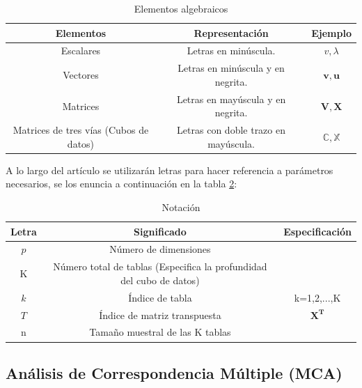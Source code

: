 \documentclass[water,article,submit,moreauthors,pdftex]{mdpi}
\begin{document}
\begin{table}[!ht]
\begin{center}
 \begin{tabular}{||c ||c |c ||} 
 \hline
 Elementos & Representación & Ejemplo \\
 \hline\hline
 Escalares & Letras en minúscula. & $v,\lambda$\\
\hline
Vectores & Letras en minúscula y en negrita. & $\mathbf{v},\mathbf{u}$\\
\hline
Matrices & Letras en mayúscula y en negrita. & $\mathbf{V},\mathbf{X}$\\
\hline
Matrices de tres vías (Cubos de datos) & Letras con doble trazo en mayúscula. & $\mathbb{C},\mathbb{X}$\\
\hline
\end{tabular}\caption{Elementos algebraicos}
\label{tab:notacion}
\end{center}
\end{table}

A lo largo del artículo se utilizarán letras para hacer referencia a
parámetros necesarios, se los enuncia a continuación en la tabla
\ref{tab:notacion2}:

\begin{table}[!ht]
\begin{center}
 \begin{tabular}{||c ||c | c ||} 
 \hline
 Letra &  Significado & Especificación\\
 \hline\hline
 $p$ & Número de dimensiones &\\
\hline
 K & Número total de tablas (Especifica la profundidad del cubo de datos) & \\
 \hline
 $k$ & Índice de tabla &  k=1,2,...,K\\
  \hline
 $T$ & Índice de matriz transpuesta &  $\mathbf{X^{T}}$\\
\hline
 n & Tamaño muestral de las K tablas &\\
\hline
\end{tabular}\caption{Notación}
\label{tab:notacion2}
\end{center}
\end{table}

\hypertarget{anuxe1lisis-de-correspondencia-muxfaltiple-mca}{%
\subsection{Análisis de Correspondencia Múltiple
(MCA)}\label{anuxe1lisis-de-correspondencia-muxfaltiple-mca}}
\end{document}
